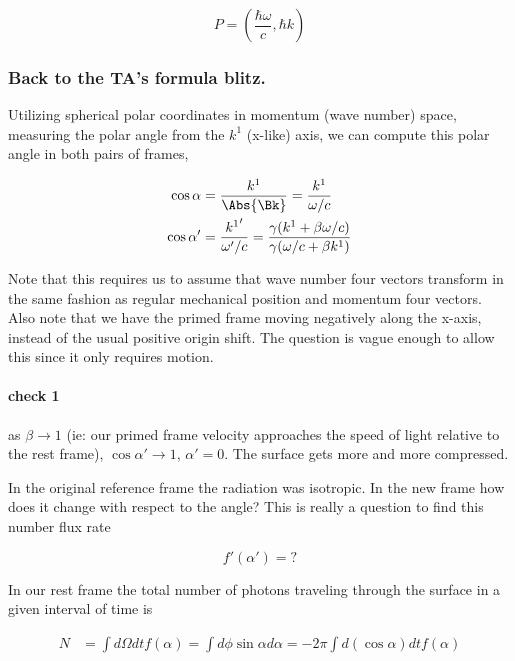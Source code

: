 \begin{equation}\label{eqn:relativisticElectrodynamicsT1:136}
P = \left( \frac{\hbar \omega}{c}, \hbar k \right)
\end{equation}

\subsubsection{Back to the TA's formula blitz.}

Utilizing spherical polar coordinates in momentum (wave number) space, measuring the polar angle from the $k^1$ (x-like) axis, we can compute this polar angle in both pairs of frames, 

\begin{align}\label{eqn:relativisticElectrodynamicsT1:140} 
\cos \alpha &= \frac{k^1}{\Abs{\Bk}} = \frac{k^1}{\omega/c} \\
\cos \alpha' &= \frac{{k^1}'}{\omega'/c} = \frac{\gamma (k^1 + \beta \omega/c)}{\gamma(\omega/c + \beta k^1)}
\end{align}

Note that this requires us to assume that wave number four vectors transform in the same fashion as regular mechanical position and momentum four vectors.  Also note that we have the primed frame moving negatively along the x-axis, instead of the usual positive origin shift.  The question is vague enough to allow this since it only requires motion.

\paragraph{check 1}

as $\beta \rightarrow 1$ (ie: our primed frame velocity approaches the speed of light relative to the rest frame), $\cos \alpha' \rightarrow 1$, $\alpha' = 0$.  The surface gets more and more compressed.

In the original reference frame the radiation was isotropic.  In the new frame how does it change with respect to the angle?  This is really a question to find this number flux rate

\begin{equation}\label{eqn:relativisticElectrodynamicsT1:150}
f'(\alpha') = ?
\end{equation}

In our rest frame the total number of photons traveling through the surface in a given interval of time is

\begin{align}\label{eqn:relativisticElectrodynamicsT1:160}
N &= \int d\Omega dt f(\alpha) = \int d \phi \sin \alpha d\alpha = -2 \pi \int d(\cos\alpha) dt f(\alpha) \\
\end{align}

